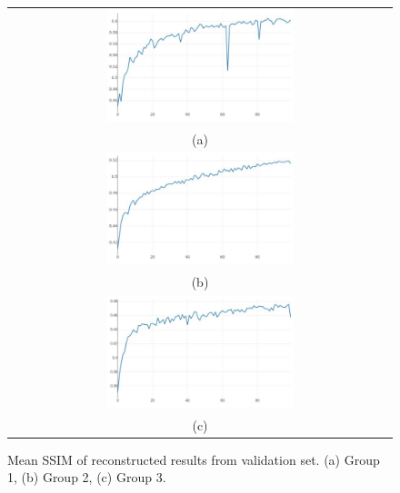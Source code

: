 \documentclass[10pt,twocolumn,letterpaper]{article}
\begin{document}
\begin{figure}%
\centering\begin{tabular}{c}
\includegraphics[width=0.5\textwidth]{fig24-a}\\
(a)\\[3ex]%
\includegraphics[width=0.5\textwidth]{fig24-b}\\
(b)\\[3ex]
\includegraphics[width=0.5\textwidth]{fig24-c}\\
(c)
\end{tabular}
\caption{Mean SSIM of reconstructed results from validation set. (a) Group 1, (b) Group 2, (c) Group 3.}%
\label{fig24}%
\end{figure}
\end{document}
